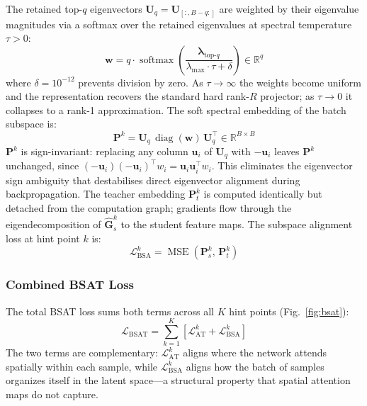 \documentclass[conference]{IEEEtran}
\begin{document}
\par
The retained top-$q$ eigenvectors $\mathbf{U}_q = \mathbf{U}_{[:,B-q:]}$ are
weighted by their eigenvalue magnitudes via a softmax over the retained
eigenvalues at spectral temperature $\tau > 0$:
\begin{equation}
    \mathbf{w} = q\cdot\operatorname{softmax}\!\!\left(
        \frac{\boldsymbol{\lambda}_{\mathrm{top}\text{-}q}}{\lambda_{\max}\cdot\tau + \delta}
    \right) \in \mathbb{R}^{q}
    \label{eq:soft_weights}
\end{equation}
where $\delta = 10^{-12}$ prevents division by zero. As $\tau\!\to\!\infty$ the
weights become uniform and the representation recovers the standard hard
rank-$R$ projector; as $\tau\!\to\!0$ it collapses to a rank-1 approximation.
The soft spectral embedding of the batch subspace is:
\begin{equation}
    \mathbf{P}^k = \mathbf{U}_q\,\operatorname{diag}(\mathbf{w})\,\mathbf{U}_q^\top
    \in \mathbb{R}^{B \times B}
    \label{eq:proj}
\end{equation}
$\mathbf{P}^k$ is sign-invariant: replacing any column $\mathbf{u}_i$ of
$\mathbf{U}_q$ with $-\mathbf{u}_i$ leaves $\mathbf{P}^k$ unchanged, since
$(-\mathbf{u}_i)(-\mathbf{u}_i)^\top w_i = \mathbf{u}_i\mathbf{u}_i^\top w_i$.
This eliminates the eigenvector sign ambiguity that destabilises direct
eigenvector alignment during backpropagation. The teacher embedding
$\mathbf{P}_t^k$ is computed identically but detached from the computation
graph; gradients flow through the eigendecomposition of $\hat{\mathbf{G}}_s^k$
to the student feature maps. The subspace alignment loss at hint point $k$ is:
\begin{equation}
    \mathcal{L}_{\mathrm{BSA}}^k =
    \operatorname{MSE}\!\left(\mathbf{P}_s^k,\, \mathbf{P}_t^k\right)
\end{equation}

\subsubsection{Combined BSAT Loss}
\par
The total BSAT loss sums both terms across all $K$ hint points (Fig.~\ref{fig:bsat}):
\begin{equation}
    \mathcal{L}_{\mathrm{BSAT}} = \sum_{k=1}^{K}
    \left[ \mathcal{L}_{\mathrm{AT}}^k + \mathcal{L}_{\mathrm{BSA}}^k \right]
\end{equation}
The two terms are complementary: $\mathcal{L}_{\mathrm{AT}}^k$
aligns where the network attends spatially within each sample, while
$\mathcal{L}_{\mathrm{BSA}}^k$ aligns how the batch of samples
organizes itself in the latent space—a structural property that
spatial attention maps do not capture.
\end{document}
